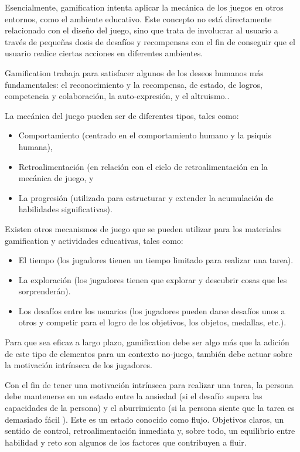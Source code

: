Esencialmente, gamification intenta aplicar la mecánica de los juegos en otros
entornos, como el ambiente educativo. Este concepto no está directamente
relacionado con el diseño del juego, sino que trata de involucrar al usuario a
través de pequeñas dosis de desafíos y recompensas con el fin de conseguir que
el usuario realice ciertas acciones en diferentes
ambientes\cite{breaking:gamification}.

Gamification trabaja para satisfacer algunos de los deseos humanos más
fundamentales: el reconocimiento y la recompensa, de estado, de logros,
competencia y colaboración, la auto-expresión, y el
altruismo.\cite{breaking:gamification}.

La mecánica del juego pueden ser de diferentes
tipos\cite{breaking:gamification}, tales como:

\begin{itemize}
    \item Comportamiento (centrado en el comportamiento humano y la psiquis
        humana),
    \item Retroalimentación (en relación con el ciclo de retroalimentación en la
        mecánica de juego, y
    \item La progresión (utilizada para estructurar y extender la acumulación de
        habilidades significativas).
\end{itemize}


Existen otros mecanismos de juego que se pueden utilizar para los materiales
gamification y actividades educativas\cite{breaking:gamification}, tales como:

\begin{itemize}
    \item El tiempo (los jugadores tienen un tiempo limitado para realizar una
        tarea).
    \item La exploración (los jugadores tienen que explorar y descubrir cosas
        que les sorprenderán).
    \item Los desafíos entre los usuarios (los jugadores pueden darse desafíos
        unos a otros y competir para el logro de los objetivos, los objetos,
        medallas, etc.).
\end{itemize}

Para que sea eficaz a largo plazo, gamification debe ser algo más que la adición
de este tipo de elementos para un contexto no-juego, también debe actuar sobre
la motivación intrínseca de los jugadores\cite{framework:gamification}. 

Con el fin de tener una motivación intrínseca para realizar una tarea, la
persona debe mantenerse en un estado entre la ansiedad (si el desafío supera las
capacidades de la persona) y el aburrimiento (si la persona siente que la tarea
es demasiado fácil ). Este es un estado conocido como flujo. Objetivos claros,
un sentido de control, retroalimentación inmediata y, sobre todo, un equilibrio
entre habilidad y reto son algunos de los factores que contribuyen a
fluir\cite{framework:gamification}.

